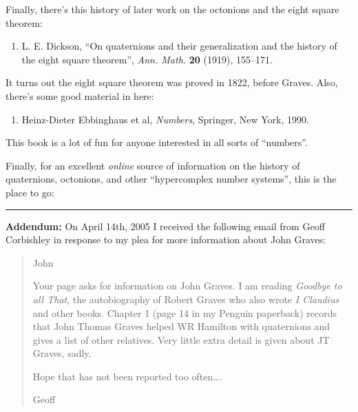 \documentclass{article}
\def\tightlist{}
\renewcommand{\texttt}[1]{%
  \begingroup
  \ttfamily
  \begingroup\lccode`~=`/\lowercase{\endgroup\def~}{/\discretionary{}{}{}}%
  \begingroup\lccode`~=`[\lowercase{\endgroup\def~}{[\discretionary{}{}{}}%
  \begingroup\lccode`~=`.\lowercase{\endgroup\def~}{.\discretionary{}{}{}}%
  \catcode`/=\active\catcode`[=\active\catcode`.=\active
  \scantokens{#1\noexpand}%
  \endgroup
}
\begin{document}
Finally, there's this history of later work on the octonions and the
eight square theorem:

\begin{enumerate}
\def\labelenumi{\arabic{enumi})}
\setcounter{enumi}{5}
\tightlist
\item
  L. E. Dickson, ``On quaternions and their generalization and the
  history of the eight square theorem'', \emph{Ann. Math.} \textbf{20}
  (1919), 155--171.
\end{enumerate}

It turns out the eight square theorem was proved in 1822, before Graves.
Also, there's some good material in here:

\begin{enumerate}
\def\labelenumi{\arabic{enumi})}
\setcounter{enumi}{6}
\tightlist
\item
  Heinz-Dieter Ebbinghaus et al, \emph{Numbers}, Springer, New York,
  1990.
\end{enumerate}

This book is a lot of fun for anyone interested in all sorts of
``numbers''.

Finally, for an excellent \emph{online} source of information on the
history of quaternions, octonions, and other ``hypercomplex number
systems'', this is the place to go:


\begin{center}\rule{0.5\linewidth}{0.5pt}\end{center}

\textbf{Addendum:} On April 14th, 2005 I received the following email
from Geoff Corbishley in response to my plea for more information about
John Graves:

\begin{quote}
John

Your page asks for information on John Graves. I am reading
\emph{Goodbye to all That}, the autobiography of Robert Graves who also
wrote \emph{I Claudius} and other books. Chapter 1 (page 14 in my
Penguin paperback) records that John Thomas Graves helped WR Hamilton
with quaternions and gives a list of other relatives. Very little extra
detail is given about JT Graves, sadly.

Hope that has not been reported too often\ldots.

Geoff
\end{quote}
\end{document}
